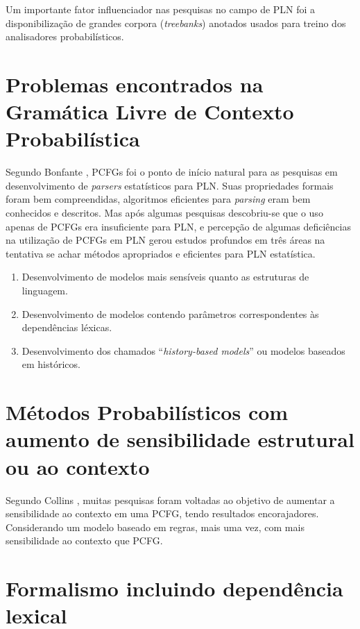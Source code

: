 Um importante fator influenciador nas pesquisas no campo de PLN foi a disponibilização de grandes corpora (\emph{treebanks}) anotados usados para treino dos analisadores probabilísticos.

\section{Problemas encontrados  na Gramática Livre de Contexto Probabilística}
\label{sec:prob_encontrados}

Segundo Bonfante \cite{bonfante03}, PCFGs foi o ponto de início natural para as pesquisas em desenvolvimento de \emph{parsers} estatísticos para PLN. Suas propriedades formais foram bem compreendidas, algoritmos eficientes para \emph{parsing} eram bem conhecidos e descritos. Mas após algumas  pesquisas descobriu-se que o uso apenas de PCFGs era insuficiente para PLN, e percepção de algumas deficiências na utilização de PCFGs em PLN gerou estudos profundos em três áreas na tentativa se achar métodos apropriados e eficientes para PLN estatística.

\begin{enumerate}
  \item Desenvolvimento de modelos mais sensíveis quanto as estruturas de linguagem.
  \item Desenvolvimento de modelos contendo parâmetros correspondentes às dependências léxicas.
  \item Desenvolvimento dos chamados ``\emph{history-based models}'' ou modelos baseados em históricos.
\end{enumerate}

\section{Métodos Probabilísticos com aumento de sensibilidade estrutural ou ao contexto}
\label{sec:aumento_sensibilidade}

Segundo Collins \cite{collins99}, muitas pesquisas foram voltadas ao objetivo de aumentar a sensibilidade ao contexto em uma PCFG, tendo resultados encorajadores. Considerando um modelo baseado em regras, mais uma vez, com mais sensibilidade ao contexto que PCFG. 

\section{Formalismo incluindo dependência lexical}
\label{sec:dependencia_lexical}

